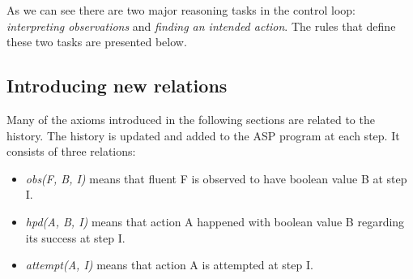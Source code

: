 \documentclass[11pt, oneside]{article}
\begin{document}
As we can see there are two major reasoning tasks in the control loop: \emph{interpreting observations} and \emph{finding an intended action}. The rules that define these two tasks are presented below.


\subsection{Introducing new relations}
Many of the axioms introduced in the following sections are related to the history. The history is updated and added to the ASP program at each step. It consists of three relations:\\
\begin{itemize}
\item \textit{obs(F, B, I)} means that fluent F is observed to have boolean value B at step I.
\item \textit{hpd(A, B, I)} means that action A happened with boolean value B regarding its success at step I.
\item \textit{attempt(A, I)} means that action A is attempted at step I.
\end{itemize}
\end{document}
